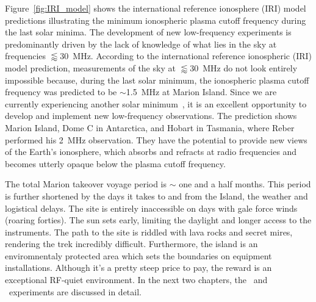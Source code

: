 Figure~\ref{fig:IRI_model} shows the international reference ionosphere (IRI) model~\citep{ars-16-1-2018} predictions illustrating the minimum ionospheric plasma cutoff frequency during the last solar minima. The development of new low-frequency experiments is predominantly driven by the lack of knowledge of what lies in the sky at frequencies $\lessapprox$\SI{30}{\mega\hertz}.  According to the international reference ionospheric (IRI) model prediction, measurements of the sky at $\lessapprox$\SI{30}{\mega\hertz} do not look entirely impossible because, during the last solar minimum, the ionospheric plasma cutoff frequency was predicted to be $\sim$\SI{1.5}{\mega\hertz} at Marion Island. Since we are currently experiencing another solar minimum~\citep{2018NatCo...9.5209B}, it is an excellent opportunity to develop and implement new low-frequency observations. The prediction shows Marion Island, Dome C in Antarctica, and Hobart in Tasmania, where Reber performed his \SI{2}{\mega\hertz} observation. They have the potential to provide new views of the Earth's ionosphere, which absorbs and refracts at radio frequencies and becomes utterly opaque below the plasma cutoff frequency. 

The total Marion takeover voyage period is $\sim$ one and a half months. This period is further shortened by the days it takes to and from the Island, the weather and logistical delays. The site is entirely inaccessible on days with gale force winds (roaring forties). The sun sets early, limiting the daylight and longer access to the instruments. The path to the site is riddled with lava rocks and secret mires, rendering the trek incredibly difficult. Furthermore, the island is an enviromnentaly protected area which sets the boundaries on equipment installations. Although it's a pretty steep price to pay, the reward is an exceptional RF-quiet environment. In the next two chapters, the \prizm\ and \albatros\ experiments are discussed in detail.

